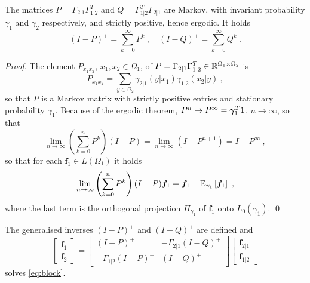 \documentclass[runningheads]{llncs}
\begin{document}
\begin{proposition}The matrices $P = \Gamma_{2|1}\Gamma_{1|2}^T$ and $Q = \Gamma_{1|2}^T\Gamma_{2|1}$ are Markov, with invariant probability $\gamma_1$ and $\gamma_2$ respectively, and strictly positive, hence ergodic. It holds
  \begin{equation*}
    (I-P)^+ = \sum_{k=0}^\infty P^k \ , \quad (I-Q)^+ = \sum_{k=0}^\infty Q^k \ . 
  \end{equation*}
\end{proposition}

\begin{proof}The element $P_{x_1x_2}$, $x_1,x_2 \in \Omega_1$, of $P = \Gamma_{2|1}\Gamma_{1|2}^T \in \mathbb R^{\Omega_1 \times \Omega_2}$ is
%
\begin{equation*}
  P_{x_1x_2} = \sum_{y \in \Omega_2} \gamma_{2|1}(y|x_1) \gamma_{1|2}(x_2|y) \ ,
\end{equation*}
%
so that $P$ is a Markov matrix with strictly positive entries and stationary probability $\gamma_1$. Because of the ergodic theorem, $P^n \to P^\infty = {\bm \gamma}_1^T \bm 1$, $n \to \infty$, so that 
%
\begin{equation*}
\lim_{n\to\infty} \left(\sum_{k=0}^n P^k\right)(I-P) = \lim_{n\to\infty} \left(I - P^{n+1}\right) = I - P^\infty \ , 
\end{equation*}
%
so that for each $\bm f_1 \in L(\Omega_1)$ it holds
%
\begin{equation*}
  \lim_{n\to\infty} \left(\sum_{k=0}^n P^k\right)(I-P) \bm f_1 = \bm f_1 - {\operatorname{\mathbb E}}_{\gamma_1}\left[\bm f_1\right] \ ,
\end{equation*}
%
where the last term is the orthogonal projection $\Pi_{\gamma_1}$ of $\bm f_1$ onto $L_0(\gamma_1)$. \qed
\end{proof}

\begin{proposition}The generalised inverses $(I-P)^+$ and $(I-Q)^+$ are defined and 
%
  \begin{equation*}
  \begin{bmatrix}
    \bm f_1 \\ \bm f_2
  \end{bmatrix}
=
    \begin{bmatrix}
      (I - P)^+ & - \Gamma_{2|1}(I - Q)^+ \\
- \Gamma_{1|2}(I-P)^+ & (I-Q)^+
    \end{bmatrix}
    \begin{bmatrix}
      \bm f_{2|1} \\ \bm f_{1|2}
    \end{bmatrix}
  \end{equation*}
%
solves \cref{eq:block}.
\end{proposition}
\end{document}
